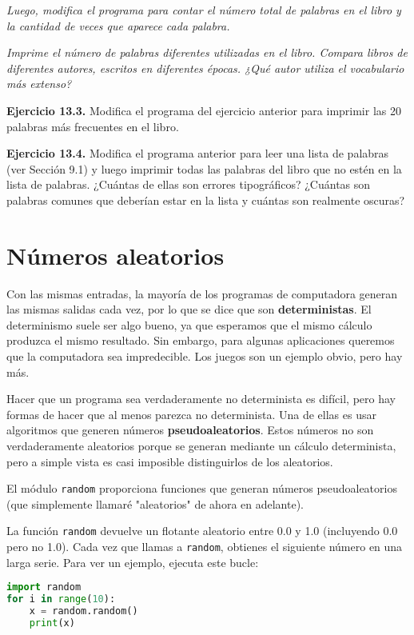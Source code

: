\textit{Luego, modifica el programa para contar el número total de palabras en el libro y la cantidad de veces que aparece cada palabra.}

\textit{Imprime el número de palabras diferentes utilizadas en el libro. Compara libros de diferentes autores, escritos en diferentes épocas. ¿Qué autor utiliza el vocabulario más extenso?}

\textbf{Ejercicio 13.3.} Modifica el programa del ejercicio anterior para imprimir las 20 palabras más frecuentes en el libro.

\textbf{Ejercicio 13.4.} Modifica el programa anterior para leer una lista de palabras (ver Sección 9.1) y luego imprimir todas las palabras del libro que no estén en la lista de palabras. ¿Cuántas de ellas son errores tipográficos? ¿Cuántas son palabras comunes que deberían estar en la lista y cuántas son realmente oscuras?

\section{Números aleatorios}

Con las mismas entradas, la mayoría de los programas de computadora generan las mismas salidas cada vez, por lo que se dice que son \textbf{deterministas}. El determinismo suele ser algo bueno, ya que esperamos que el mismo cálculo produzca el mismo resultado. Sin embargo, para algunas aplicaciones queremos que la computadora sea impredecible. Los juegos son un ejemplo obvio, pero hay más.

Hacer que un programa sea verdaderamente no determinista es difícil, pero hay formas de hacer que al menos parezca no determinista. Una de ellas es usar algoritmos que generen números \textbf{pseudoaleatorios}. Estos números no son verdaderamente aleatorios porque se generan mediante un cálculo determinista, pero a simple vista es casi imposible distinguirlos de los aleatorios.

El módulo \texttt{random} proporciona funciones que generan números pseudoaleatorios (que simplemente llamaré "aleatorios" de ahora en adelante).

La función \texttt{random} devuelve un flotante aleatorio entre 0.0 y 1.0 (incluyendo 0.0 pero no 1.0). Cada vez que llamas a \texttt{random}, obtienes el siguiente número en una larga serie. Para ver un ejemplo, ejecuta este bucle:

\begin{lstlisting}[language=Python]
import random
for i in range(10):
    x = random.random()
    print(x)
\end{lstlisting}

